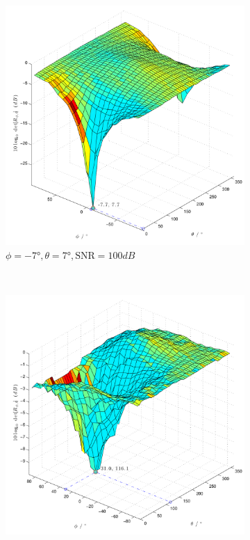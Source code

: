 \begin{figure}
\begin{subfigure}[b]{0.48\textwidth}
                \centering
                \includegraphics[width=\textwidth]{grafiken/02_Konzeptionierung/Sim_voice_Phi_-7_Theta_7_SNR_100dB_log}
                \caption{$\phi=-7°,\theta=7°, \mathrm{SNR}=100dB$}
                \label{fig:Sim_Phi_-7_Theta_7_dB}
        \end{subfigure}
        ~ %
        \begin{subfigure}[b]{0.48\textwidth}
                \centering
                \includegraphics[width=\textwidth]{grafiken/02_Konzeptionierung/Sim_voice_Phi_30_Theta_120_SNR_5dB_log}

\end{subfigure}
\end{figure}
